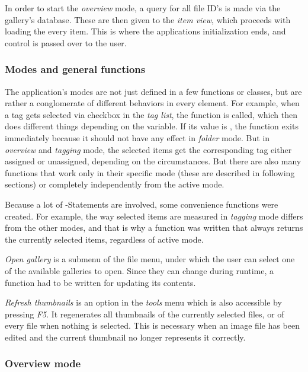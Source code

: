 In order to start the \emph{overview} mode, a query for all file ID's is made via the
gallery's database. These are then given to the \emph{item view}, which proceeds
with loading the every item. This is where the applications initialization
ends, and control is passed over to the user. 

\subsubsection{Modes and general functions}

The application's modes are not just defined in a few functions or classes, but are rather a conglomerate of 
different behaviors in every element. For example, when a tag gets selected via checkbox in the \emph{tag list}, the function  is called, which then does different things depending on the  variable. If its value is , the function exits immediately because it should not have any effect in \emph{folder} mode. But in \emph{overview} and \emph{tagging} mode, the selected items get the corresponding tag either assigned or unassigned, depending on the circumstances. But there are also many functions that work only in their specific mode (these are described in following sections) or completely independently from the active mode.

Because a lot of -Statements are involved, some convenience functions were created. For example, the way selected items are measured in \emph{tagging} mode differs from the other modes, and that is why a function was written that always returns the currently selected items, regardless of active mode.

\emph{Open gallery} is a submenu of the file menu, under which the user can
select one of the available galleries to open. Since they can change during
runtime, a function had to be written for updating its contents.

\emph{Refresh thumbnails} is an option in the \emph{tools} menu which is also accessible by pressing \emph{F5}. It regenerates all thumbnails of the currently selected files, or of every file when nothing is selected. This is necessary when an image file has been edited and the current thumbnail no longer represents it correctly.

\subsubsection{Overview mode}

